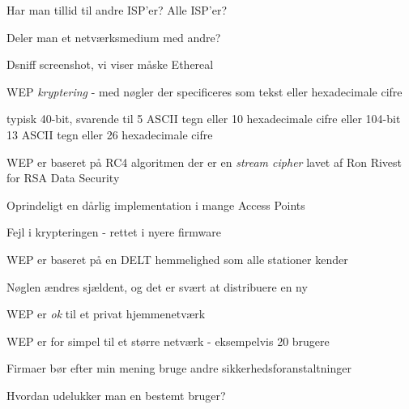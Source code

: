 \documentclass[20pt,landscape,a4paper,footrule]{foils}
\begin{document}
\begin{list1}
\item Har man tillid til andre ISP'er? Alle ISP'er?
\item Deler man et netværksmedium med andre?
\end{list1}





\centerline{Dsniff screenshot, vi viser måske Ethereal}


\begin{list1}
\item WEP \emph{kryptering} - med nøgler der specificeres som tekst
  eller hexadecimale cifre
\item typisk 40-bit, svarende til 5 ASCII tegn eller 10 hexadecimale
  cifre eller 104-bit 13 ASCII tegn eller 26 hexadecimale cifre
\item WEP er baseret på RC4 algoritmen der er en \emph{stream cipher}
  lavet af Ron Rivest for RSA Data Security
\end{list1}


\begin{list1}
\item Oprindeligt en dårlig implementation i mange Access Points
\item Fejl i krypteringen - rettet i nyere firmware
\item WEP er baseret på en DELT hemmelighed som alle stationer kender
\item Nøglen ændres sjældent, og det er svært at distribuere en ny
\end{list1}


\begin{list1}
\item WEP er \emph{ok} til et privat hjemmenetværk
\item WEP er for simpel til et større netværk - eksempelvis 20 brugere
\item Firmaer bør efter min mening bruge andre
  sikkerhedsforanstaltninger
\item Hvordan udelukker man en bestemt bruger?
\end{list1}
\end{document}
